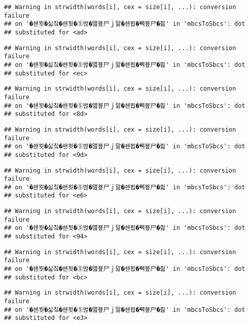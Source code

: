 \documentclass[]{article}
\begin{document}
\begin{verbatim}
## Warning in strwidth(words[i], cex = size[i], ...): conversion failure
## on '�쇈묏�싧칰�쇈묏�⑤벊�앮뵾尸ｊ맒�쇈묍�붹뵾尸�즲' in 'mbcsToSbcs': dot
## substituted for <ad>
\end{verbatim}

\begin{verbatim}
## Warning in strwidth(words[i], cex = size[i], ...): conversion failure
## on '�쇈묏�싧칰�쇈묏�⑤벊�앮뵾尸ｊ맒�쇈묍�붹뵾尸�즲' in 'mbcsToSbcs': dot
## substituted for <ec>
\end{verbatim}

\begin{verbatim}
## Warning in strwidth(words[i], cex = size[i], ...): conversion failure
## on '�쇈묏�싧칰�쇈묏�⑤벊�앮뵾尸ｊ맒�쇈묍�붹뵾尸�즲' in 'mbcsToSbcs': dot
## substituted for <8d>
\end{verbatim}

\begin{verbatim}
## Warning in strwidth(words[i], cex = size[i], ...): conversion failure
## on '�쇈묏�싧칰�쇈묏�⑤벊�앮뵾尸ｊ맒�쇈묍�붹뵾尸�즲' in 'mbcsToSbcs': dot
## substituted for <9d>
\end{verbatim}

\begin{verbatim}
## Warning in strwidth(words[i], cex = size[i], ...): conversion failure
## on '�쇈묏�싧칰�쇈묏�⑤벊�앮뵾尸ｊ맒�쇈묍�붹뵾尸�즲' in 'mbcsToSbcs': dot
## substituted for <e6>
\end{verbatim}

\begin{verbatim}
## Warning in strwidth(words[i], cex = size[i], ...): conversion failure
## on '�쇈묏�싧칰�쇈묏�⑤벊�앮뵾尸ｊ맒�쇈묍�붹뵾尸�즲' in 'mbcsToSbcs': dot
## substituted for <94>
\end{verbatim}

\begin{verbatim}
## Warning in strwidth(words[i], cex = size[i], ...): conversion failure
## on '�쇈묏�싧칰�쇈묏�⑤벊�앮뵾尸ｊ맒�쇈묍�붹뵾尸�즲' in 'mbcsToSbcs': dot
## substituted for <bc>
\end{verbatim}

\begin{verbatim}
## Warning in strwidth(words[i], cex = size[i], ...): conversion failure
## on '�쇈묏�싧칰�쇈묏�⑤벊�앮뵾尸ｊ맒�쇈묍�붹뵾尸�즲' in 'mbcsToSbcs': dot
## substituted for <e3>
\end{verbatim}
\end{document}

